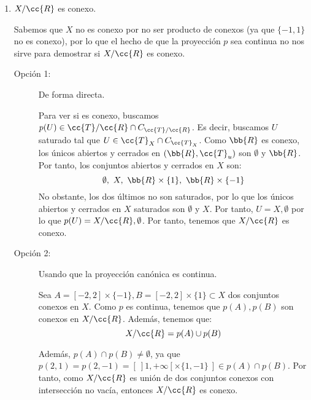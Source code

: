 \documentclass[12pt]{article}
\newcommand{\T}[0]{\cc{T}}
\begin{document}
\begin{ejercicio}[2.5 puntos]
\begin{enumerate}

            \item $X/\cc{R}$ es conexo.
            
            Sabemos que $X$ no es conexo por no ser producto de conexos (ya que $\{-1,1\}$ no es conexo),
            por lo que el hecho de que la proyección $p$ sea continua no nos sirve para demostrar si $X/\cc{R}$ es conexo.

            \begin{description}
              \item[Opción 1:] De forma directa.
              
              Para ver si es conexo, buscamos $p(U)\in \T/\cc{R}\cap C_{\T/\cc{R}}$.
              Es decir, buscamos $U$ saturado tal que $U\in \T_X\cap C_{\T_X}$.
              Como $\bb{R}$ es conexo, los únicos abiertos y cerrados en $(\bb{R}, \T_u)$ son $\emptyset$ y $\bb{R}$. Por tanto,
              los conjuntos abiertos y cerrados en $X$ son:
              \begin{equation*}
                  \emptyset,~X,~\bb{R}\times \{1\},~\bb{R}\times \{-1\}
              \end{equation*}
              No obstante, los dos últimos no son saturados, por lo que
              los únicos abiertos y cerrados en $X$ saturados son $\emptyset$ y $X$.
              Por tanto, $U=X, \emptyset$ por lo que $p(U)=X/\cc{R}, \emptyset$.
              Por tanto, tenemos que $X/\cc{R}$ es conexo.

              \item[Opción 2:] Usando que la proyección canónica es continua.
              
              Sea $A=[-2,2] \times \{-1\}, B=[-2,2] \times \{1\}\subset X$ dos conjuntos conexos en $X$. Como $p$ es continua, tenemos que
              $p(A), p(B)$ son conexos en $X/\cc{R}$. Además, tenemos que:
              \begin{equation*}
                X/\cc{R} = p(A) \cup p(B)
              \end{equation*}

              Además, $p(A)\cap p(B) \neq \emptyset$, ya que $p(2,1)=p(2,-1)=[~]1, +\infty[ \times \{1,-1\}~]\in p(A)\cap p(B)$.
              Por tanto, como $X/\cc{R}$ es unión de dos conjuntos conexos con intersección no vacía, entonces $X/\cc{R}$ es conexo.
            \end{description}
        \end{enumerate}
    \end{ejercicio}
\end{document}
